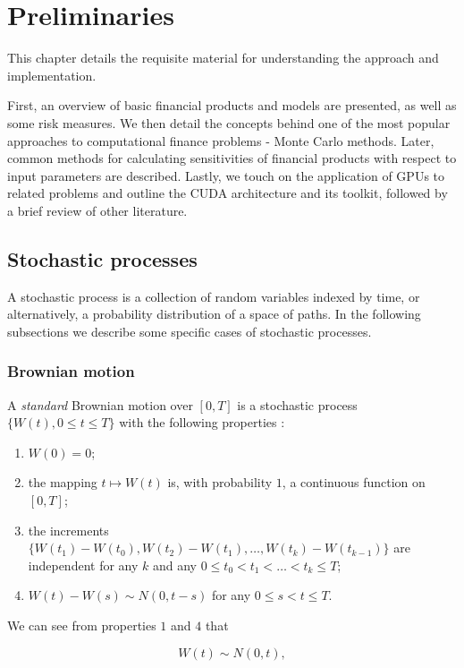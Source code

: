 \chapter{Preliminaries} \label{cha:Preliminaries}
This chapter details the requisite material for understanding the approach and implementation.

First, an overview of basic financial products and models are presented, as well as some risk measures. We then detail the concepts behind one of the most popular approaches to computational finance problems - Monte Carlo methods. Later, common methods for calculating sensitivities of financial products with respect to input parameters are described. Lastly, we touch on the application of GPUs to related problems and outline the CUDA architecture and its toolkit, followed by a brief review of other literature.

\section{Stochastic processes}
A stochastic process is a collection of random variables indexed by time, or alternatively, a probability distribution of a space of paths. In the following subsections we describe some specific cases of stochastic processes.

\subsection{Brownian motion}
A \textit{standard} Brownian motion over $[0,T]$ is a stochastic process $\{W(t), 0 \le t \le T\}$ with the following properties \cite{glasserman2004monte}:

\begin{enumerate}
    \item $W(0) = 0$;
    \item the mapping $t \mapsto W(t)$ is, with probability $1$, a continuous function on $[0,T]$;
    \item the increments $\{ W(t_1) - W(t_0), W(t_2) - W(t_1),\dots,W(t_k) - W(t_{k-1})\}$ are independent for any $k$ and any $0 \le t_0 < t_1 < \dots < t_k \le T$;
    \item $W(t) - W(s) \sim N(0, t-s)$ for any $0 \le s < t \le T$.
\end{enumerate}

We can see from properties $1$ and $4$ that 

\begin{equation}
    W(t) \sim N(0,t),
\end{equation}

